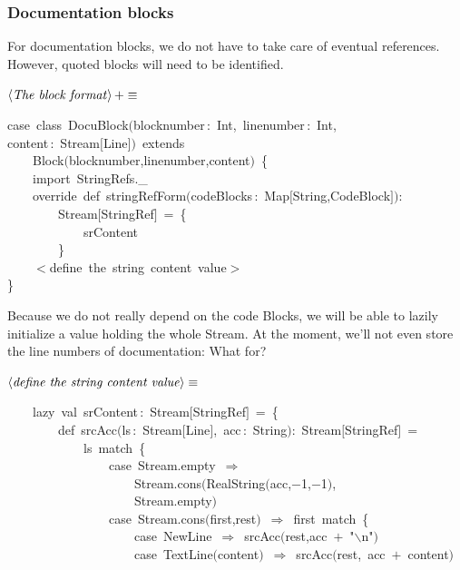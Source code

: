 \documentclass[a4paper,12pt]{article}
\begin{document}
\subsubsection{Documentation blocks}
For documentation blocks, we do not have to take care of eventual references.
However, quoted blocks will need to be identified.

$\left<\mbox{\emph{The block format}}\right>+\equiv$
\begin{program}{\vem case}~{\vem class}~DocuBlock$($blocknumber\,{\rm :}~Int,~linenumber\,{\rm :}~Int,
\\content\,{\rm :}~Stream$[$Line$]$$)$~{\vem extends}
\\~~~~Block$($blocknumber,linenumber,content$)$~{\small\{}
\\~~~~{\vem import}~StringRefs.\_
\\~~~~{\vem override}~{\vem def}~stringRefForm$($codeBlocks\,{\rm :}~Map$[$String,CodeBlock$]$$)${\rm :}
\\~~~~~~~~Stream$[$StringRef$]$~=~{\small\{}
\\~~~~~~~~~~~~srContent
\\~~~~~~~~{\small\}}
\\~~~~$<$define~the~string~content~value$>$
\\{\small\}}
\\[0.5em]\end{program}



Because we do not really depend on the code Blocks, we will be able
to lazily initialize a value holding the whole Stream. At the moment,
we'll not even store the line numbers of documentation: What for?

$\left<\mbox{\emph{define the string content value}}\right>\equiv$
\begin{program}~~~~{\vem lazy}~{\vem val}~srContent\,{\rm :}~Stream$[$StringRef$]$~=~{\small\{}
\\~~~~~~~~{\vem def}~srcAcc$($ls\,{\rm :}~Stream$[$Line$]$,~acc\,{\rm :}~String$)${\rm :}~Stream$[$StringRef$]$~=
\\~~~~~~~~~~~~ls~{\vem match}~{\small\{}
\\~~~~~~~~~~~~~~~~{\vem case}~Stream.empty~$\Rightarrow$
\\~~~~~~~~~~~~~~~~~~~~Stream.cons$($RealString$($acc,$-$1,$-$1$)$,
\\~~~~~~~~~~~~~~~~~~~~Stream.empty$)$
\\~~~~~~~~~~~~~~~~{\vem case}~Stream.cons$($first,rest$)$~$\Rightarrow$~first~{\vem match}~{\small\{}
\\~~~~~~~~~~~~~~~~~~~~{\vem case}~NewLine~$\Rightarrow$~srcAcc$($rest,acc~$+$~"$\backslash$n"$)$
\\~~~~~~~~~~~~~~~~~~~~{\vem case}~TextLine$($content$)$~$\Rightarrow$~srcAcc$($rest,~acc~$+$~content$)$
\\[0.5em]\end{program}
\end{document}
